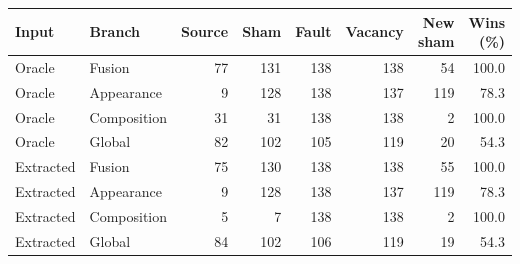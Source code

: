 \begin{tabular}{llrrrrrr}
\toprule
Input & Branch & Source & Sham & Fault & Vacancy & New sham & Wins (\%) \\
\midrule
Oracle & Fusion & 77 & 131 & 138 & 138 & 54 & 100.0 \\
Oracle & Appearance & 9 & 128 & 138 & 137 & 119 & 78.3 \\
Oracle & Composition & 31 & 31 & 138 & 138 & 2 & 100.0 \\
Oracle & Global & 82 & 102 & 105 & 119 & 20 & 54.3 \\
\midrule
Extracted & Fusion & 75 & 130 & 138 & 138 & 55 & 100.0 \\
Extracted & Appearance & 9 & 128 & 138 & 137 & 119 & 78.3 \\
Extracted & Composition & 5 & 7 & 138 & 138 & 2 & 100.0 \\
Extracted & Global & 84 & 102 & 106 & 119 & 19 & 54.3 \\
\bottomrule
\end{tabular}
